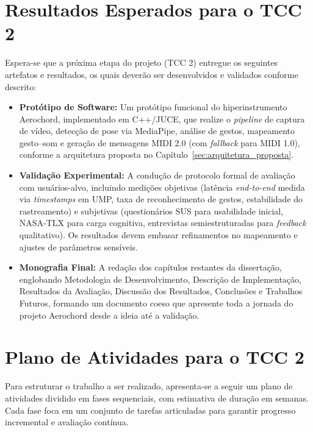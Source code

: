 \section{Resultados Esperados para o TCC 2}
\label{sec:resultados_esperados_tcc2}

Espera-se que a próxima etapa do projeto (TCC 2) entregue os seguintes artefatos e resultados, os quais deverão ser desenvolvidos e validados conforme descrito:

\begin{itemize}
    \item \textbf{Protótipo de Software:} Um protótipo funcional do hiperinstrumento Aerochord, implementado em C++/JUCE, que realize o \textit{pipeline} de captura de vídeo, detecção de pose via MediaPipe, análise de gestos, mapeamento gesto–som e geração de mensagens MIDI 2.0 (com \textit{fallback} para MIDI 1.0), conforme a arquitetura proposta no Capítulo~\ref{sec:arquitetura_proposta}.
    \item \textbf{Validação Experimental:} A condução de protocolo formal de avaliação com usuários-alvo, incluindo medições objetivas (latência \textit{end-to-end} medida via \textit{timestamps} em UMP, taxa de reconhecimento de gestos, estabilidade do rastreamento) e subjetivas (questionários SUS para usabilidade inicial, NASA-TLX para carga cognitiva, entrevistas semiestruturadas para \textit{feedback} qualitativo). Os resultados devem embasar refinamentos no mapeamento e ajustes de parâmetros sensíveis.
    \item \textbf{Monografia Final:} A redação dos capítulos restantes da dissertação, englobando Metodologia de Desenvolvimento, Descrição de Implementação, Resultados da Avaliação, Discussão dos Resultados, Conclusões e Trabalhos Futuros, formando um documento coeso que apresente toda a jornada do projeto Aerochord desde a ideia até a validação.
\end{itemize}

\section{Plano de Atividades para o TCC 2}
\label{sec:plano_atividades_tcc2}

Para estruturar o trabalho a ser realizado, apresenta-se a seguir um plano de atividades dividido em fases sequenciais, com estimativa de duração em semanas. Cada fase foca em um conjunto de tarefas articuladas para garantir progresso incremental e avaliação contínua.

